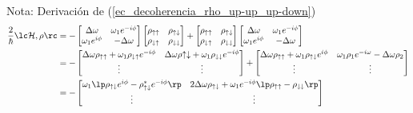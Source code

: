     \begin{mybox_blue}{Nota: Derivación de (\ref{ec_decoherencia_rho_up-up_up-down})}
        \begin{align*}
            \frac{2}{\hbar}\lc \mathcal{H} , \rho \rc & = - 
            \begin{bmatrix}
            \Delta \omega & \omega_1 e^{-i \phi} \\
            \omega_1 e^{i \phi} & - \Delta \omega
            \end{bmatrix} 
            \begin{bmatrix}
            \rho_{\uparrow \uparrow} & \rho_{\uparrow \downarrow} \\
            \rho_{\downarrow \uparrow} & \rho_{\downarrow \downarrow}
            \end{bmatrix}
            +
            \begin{bmatrix}
            \rho_{\uparrow \uparrow} & \rho_{\uparrow \downarrow} \\
            \rho_{\downarrow \uparrow} & \rho_{\downarrow \downarrow}
            \end{bmatrix}
            \begin{bmatrix}
            \Delta \omega & \omega_1 e^{-i \phi} \\
            \omega_1 e^{i \phi} & - \Delta \omega
            \end{bmatrix}  \\
            & = -  \begin{bmatrix}
            \Delta \omega \rho_{\uparrow \uparrow} +
            \omega_1 \rho_{\downarrow \uparrow} e^{-i \phi} 
            & \Delta \omega \rho{\uparrow \downarrow} + \omega_1 \rho_{\downarrow \downarrow} e^{-i \phi} \\
            \vdots & \vdots
            \end{bmatrix}
            +  \begin{bmatrix}
            \Delta \omega \rho_{\uparrow \uparrow} + \omega_1 \rho_{\uparrow \downarrow} e^{i \phi} & \omega_1 \rho_1 e^{-i \omega} - \Delta \omega \rho_2 \\
            \vdots & \vdots 
            \end{bmatrix} \\
            & = - \begin{bmatrix}
            \omega_1 \lp \rho_{\uparrow \downarrow} e^{i \phi} - \rho^{*}_{\uparrow \downarrow} e^{-i \phi} \rp & 
            2 \Delta \omega \rho_{\uparrow \downarrow} + \omega_1 e^{-i \phi} \lp \rho_{\uparrow \uparrow} - \rho_{\downarrow \downarrow} \rp \\
            \vdots & \vdots
            \end{bmatrix}
        \end{align*}
    \end{mybox_blue}
    
